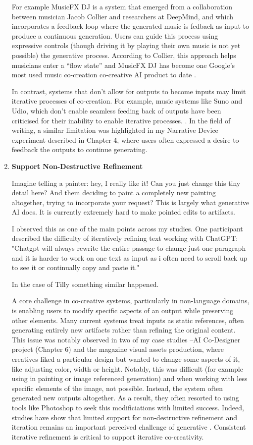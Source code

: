 \begin{enumerate}
For example MusicFX DJ is a system that emerged from a collaboration between musician Jacob Collier and researchers at DeepMind, and which incorporates a feedback loop where the generated music is fedback as input to produce a continuous generation. Users can guide this process using expressive controls (though driving it by playing their own music is not yet possible) the generative process. According to Collier, this approach helps musicians enter a “flow state” and MusicFX DJ has become one Google’s most used music co-creation co-creative AI product to date \cite{Barrar2024-sb}. 

In contrast, systems that don't allow for outputs to  become inputs may limit iterative processes of co-creation. For example, music systems like Suno and Udio, which don't enable seamless feeding back of outputs have been criticised for their inability to enable iterative processes. \cite{Eno2024-rj}. In the field of writing, a similar limitation was highlighted in my Narrative Device experiment described in Chapter 4, where users often expressed a desire to feedback the outputs to continue generating. 

\item \textbf{Support Non-Destructive Refinement}

Imagine telling a painter: hey, I really like it! Can you just change this tiny detail here? And them deciding to paint a completely new painting altogether, trying to incorporate your request? This is largely what generative AI does. It is currently extremely hard to make pointed edits to artifacts. 

I observed this as one of the main points across my studies. 
One participant described the difficulty of iteratively refining text working with ChatGPT:
"Chatgpt will always rewrite the entire passage to change just one paragraph and it is harder to work on one text as input as i often need to scroll back up to see it or continually copy and paste it."

In the case of Tilly something similar happened. 

A core challenge in co-creative systems, particularly in non-language domains, is enabling users to modify specific aspects of an output while preserving other elements. Many current systems treat inputs as static references, often generating entirely new artifacts rather than refining the original content. This issue was notably observed in two of my case studies --AI Co-Designer project (Chapter 6) and the magazine visual assets production, where creatives liked a particular design but wanted to change some aspects of it, like adjusting color, width or height. Notably, this was difficult (for example using in painting or image referenced generation) and when working with less specific elements of the image, not possible. Instead, the system often generated new outputs altogether. As a result, they often resorted to using tools like Photoshop to seek this modificiations with limited success. Indeed, studies have show that limited support for non-destructive refinement and iteration remains an important perceived challenge of generative \cite{Park2024-gw}. Consistent iterative refinement is critical to support iterative co-creativity.



\end{enumerate}
